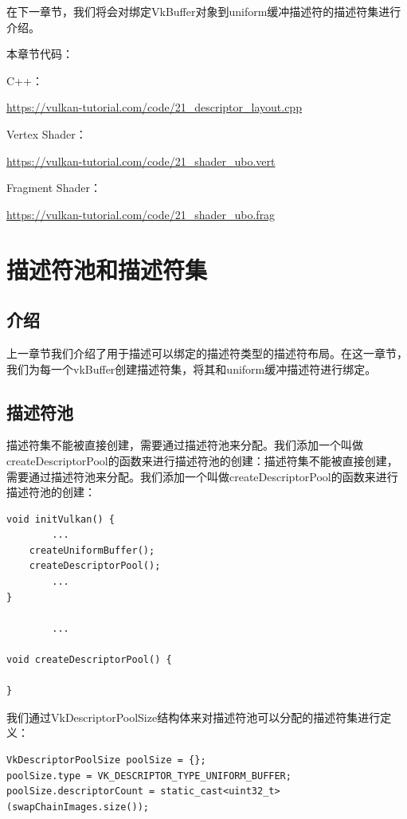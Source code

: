 \documentclass{ctexart}
\begin{document}
在下一章节，我们将会对绑定VkBuffer对象到uniform缓冲描述符的描述符集进行介绍。

本章节代码：

C++：

\url{https://vulkan-tutorial.com/code/21_descriptor_layout.cpp}

Vertex Shader：

\url{https://vulkan-tutorial.com/code/21_shader_ubo.vert}

Fragment Shader：

\url{https://vulkan-tutorial.com/code/21_shader_ubo.frag}

\newpage
\section{描述符池和描述符集}

\subsection{介绍}

上一章节我们介绍了用于描述可以绑定的描述符类型的描述符布局。在这一章节，我们为每一个vkBuffer创建描述符集，将其和uniform缓冲描述符进行绑定。

\subsection{描述符池}

描述符集不能被直接创建，需要通过描述符池来分配。我们添加一个叫做createDescriptorPool的函数来进行描述符池的创建：描述符集不能被直接创建，需要通过描述符池来分配。我们添加一个叫做createDescriptorPool的函数来进行描述符池的创建：

\begin{lstlisting}[language={[ANSI]C}]
void initVulkan() {
		...
	createUniformBuffer();
	createDescriptorPool();
		...
}

		...

void createDescriptorPool() {

}
\end{lstlisting}

我们通过VkDescriptorPoolSize结构体来对描述符池可以分配的描述符集进行定义：

\begin{lstlisting}[language={[ANSI]C}]
VkDescriptorPoolSize poolSize = {};
poolSize.type = VK_DESCRIPTOR_TYPE_UNIFORM_BUFFER;
poolSize.descriptorCount = static_cast<uint32_t>(swapChainImages.size());
\end{lstlisting}
\end{document}

